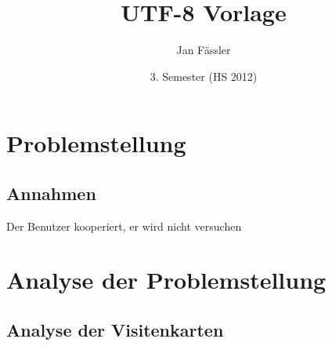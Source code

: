\documentclass[10pt]{article}
\title{
	\vspace{5cm}
	UTF-8 Vorlage
}
\author{Jan Fässler}
\date{3. Semester (HS 2012)}
\begin{document}
\maketitle
\thispagestyle{fancy}

\newpage

\tableofcontents	  	


\newpage
\setcounter{page}{1}


\section{Problemstellung}

\subsection{Annahmen}
Der Benutzer kooperiert, er wird nicht versuchen 

\section{Analyse der Problemstellung}

\subsection{Analyse der Visitenkarten}
\end{document}
